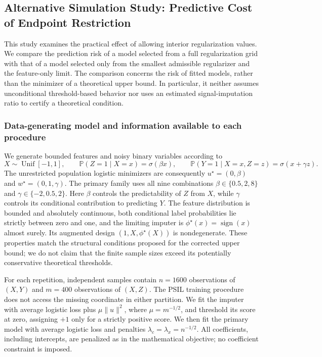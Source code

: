 \iffalse
\subsection{Alternative Simulation Study: Predictive Cost of Endpoint Restriction}
\label{subsec:psil_alternative_experiments}

This study examines the practical effect of allowing interior regularization values. We compare the prediction risk of a model selected from a full regularization grid with that of a model selected only from the smallest admissible regularizer and the feature-only limit. The comparison concerns the risk of fitted models, rather than the minimizer of a theoretical upper bound. In particular, it neither assumes unconditional threshold-based behavior nor uses an estimated signal-imputation ratio to certify a theoretical condition.

\subsubsection{Data-generating model and information available to each procedure}

We generate bounded features and noisy binary variables according to
\begin{equation}
X\sim\operatorname{Unif}[-1,1],\qquad
\mathbb P(Z=1\mid X=x)=\sigma(\beta x),\qquad
\mathbb P(Y=1\mid X=x,Z=z)=\sigma(x+\gamma z).
\label{eq:psil_alt_generator}
\end{equation}
The unrestricted population logistic minimizers are consequently
$u^\star=(0,\beta)$ and $w^\star=(0,1,\gamma)$.
The primary family uses all nine combinations
$\beta\in\{0.5,2,8\}$ and $\gamma\in\{-2,0.5,2\}$.
Here $\beta$ controls the predictability of $Z$ from $X$, while $\gamma$ controls its conditional contribution to predicting $Y$.
The feature distribution is bounded and absolutely continuous, both conditional label probabilities lie strictly between zero and one, and the limiting imputer is $\phi^\star(x)=\operatorname{sign}(x)$ almost surely. Its augmented design $(1,X,\phi^\star(X))$ is nondegenerate. These properties match the structural conditions proposed for the corrected upper bound; we do not claim that the finite sample sizes exceed its potentially conservative theoretical thresholds.

For each repetition, independent samples contain $n=1600$ observations of $(X,Y)$ and $m=400$ observations of $(X,Z)$. The PSIL training procedure does not access the missing coordinate in either partition. We fit the imputer with average logistic loss plus $\mu\|u\|^2$, where $\mu=m^{-1/2}$, and threshold its score at zero, assigning $+1$ only for a strictly positive score. We then fit the primary model with average logistic loss and penalties $\lambda_c=\lambda_x=n^{-1/2}$. All coefficients, including intercepts, are penalized as in the mathematical objective; no coefficient constraint is imposed.

